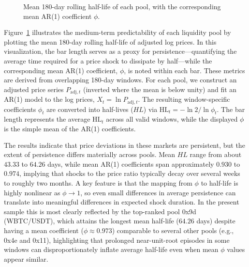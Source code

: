 \documentclass[journal]{IEEEtran}
\begin{document}
\begin{figure}[ht]
\centering
\resizebox{0.5\textwidth}{!}{%
        
    }
\caption{Mean 180-day rolling half-life of each pool, with the corresponding mean AR(1) coefficient $\phi$.}
\label{fig:half_life_180d_mean_phi_inside}
\end{figure}

Figure~\ref{fig:half_life_180d_mean_phi_inside} illustrates the medium-term predictability of each liquidity pool by plotting the mean 180-day rolling half-life of adjusted log prices. In this visualization, the bar length serves as a proxy for persistence---quantifying the average time required for a price shock to dissipate by half---while the corresponding mean AR(1) coefficient, $\phi$, is noted within each bar. These metrics are derived from overlapping 180-day windows. For each pool, we construct an adjusted price series $P_{\text{adj},t}$ (inverted where the mean is below unity) and fit an AR(1) model to the log prices, $X_t=\ln P_{\text{adj},t}$. The resulting window-specific coefficients $\phi_t$ are converted into half-lives ($HL$) via $\mathrm{HL}_t=-\ln 2 / \ln \phi_t$. The bar length represents the average $\mathrm{HL}_t$ across all valid windows, while the displayed $\phi$ is the simple mean of the AR(1) coefficients.

The results indicate that price deviations in these markets are persistent, but the extent of persistence differs materially across pools. Mean $HL$ range from about $43.33$ to $64.26$ days, while mean AR(1) coefficients span approximately $0.930$ to $0.974$, implying that shocks to the price ratio typically decay over several weeks to roughly two months. A key feature is that the mapping from $\phi$ to half-life is highly nonlinear as $\phi \to 1$, so even small differences in average persistence can translate into meaningful differences in expected shock duration. In the present sample this is most clearly reflected by the top-ranked pool 0x9d (WBTC/USDT), which attains the longest mean half-life ($64.26$ days) despite having a mean coefficient ($\phi\approx0.973$) comparable to several other pools (e.g., 0x4e and 0x11), highlighting that prolonged near-unit-root episodes in some windows can disproportionately inflate average half-life even when mean $\phi$ values appear similar.
\end{document}
